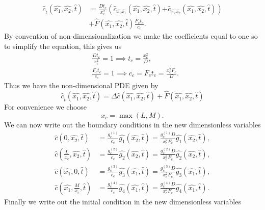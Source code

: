 \documentclass[\main/thesis.tex]{subfiles}
\begin{document}
\begin{align}
\hat{c}_{\hat{t}}(\hat{x_1}, \hat{x_2}, \hat{t}) 
&{=} \frac{D t_c}{x_c^2} \left ( \hat{c}_{\hat{x_1}\hat{x_1}}(\hat{x_1}, \hat{x_2}, \hat{t}) \right.
\left. {+} \hat{c}_{\hat{x_2}\hat{x_2}}(\hat{x_1}, \hat{x_2}, \hat{t}) \right) \label{eq:dimensionlessPDE1}\\
&{+} \hat{F}(\hat{x_1}, \hat{x_2}, \hat{t}) \frac{F_c t_c}{c_c}.
\nonumber
\end{align}
By convention of non-dimensionalization we make the coefficients equal to one so to simplify the equation, this gives us
\begin{align}
&\frac{D t_c}{x_c^2} {=} 1 {\implies} t_c {=} \frac{x_c^2}{D}, \label{eq:characteristicTime}\\
&\frac{F_c t_c}{c_c} {=} 1 {\implies} c_c {=} F_c t_c {=} \frac{x_c^2 F_c}{D}. \label{eq:characteristicConcen}
\end{align}
Thus we have the non-dimensional PDE given by
\begin{equation}
\hat{c}_{\hat{t}}(\hat{x_1}, \hat{x_2}, \hat{t}) 
{=} \Delta \hat{c}(\hat{x_1}, \hat{x_2}, \hat{t}) {+} \hat{F}(\hat{x_1}, \hat{x_2}, \hat{t})
\label{eq:DimensionlessPDE}
\end{equation}
For convenience we choose 
\begin{equation}
x_c {=} \max(L, M).
\label{eq:characteristicSpaceVar}
\end{equation}
We can now write out the boundary conditions in the new dimensionless variables
\begin{align}
\hat{c}(0, \hat{x_2}, \hat{t}) &{=} \frac{g_c^{(1)}}{c_c} \hat{g_1}(\hat{x_2}, \hat{t})
{=} \frac{g_c^{(1)} D}{x_c^2 F_c} \hat{g_1}(\hat{x_2}, \hat{t}),
\label{eq:DimensionlessBC1}\\
\hat{c}\left(\frac{L}{x_c}, \hat{x_2}, \hat{t}\right) &{=} \frac{g_c^{(2)}}{c_c} \hat{g_2}(\hat{x_2}, \hat{t})
{=} \frac{g_c^{(2)} D}{x_c^2 F_c} \hat{g_2}(\hat{x_2}, \hat{t}),
\label{eq:DimensionlessBC2}\\
\hat{c}(\hat{x_1}, 0, \hat{t}) &{=} \frac{g_c^{(3)}}{c_c} \hat{g_3}(\hat{x_1}, \hat{t})
{=} \frac{g_c^{(3)} D}{x_c^2 F_c} \hat{g_3}(\hat{x_1}, \hat{t}),
\label{eq:DimensionlessBC3}\\
\hat{c}\left(\hat{x_1}, \frac{M}{x_c}, \hat{t}\right) &{=} \frac{g_c^{(4)}}{c_c} \hat{g_4}(\hat{x_1}, \hat{t})
{=} \frac{g_c^{(4)} D}{x_c^2 F_c} \hat{g_4}(\hat{x_1}, \hat{t}).
\label{eq:DimensionlessBC4}
\end{align}
Finally we write out the initial condition in the new dimensionless variables
\end{document}
